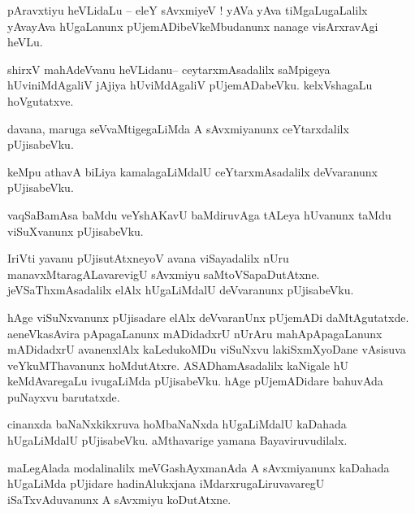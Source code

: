 \documentclass{article}
\begin{document}

\begin{mn}%
pAravxtiyu heVLidaLu -- eleY sAvxmiyeV ! yAVa yAva tiMgaLugaLalilx yAvayAva hUgaLanunx 
pUjemADibeVkeMbudanunx nanage visArxravAgi heVLu.
\end{mn}

\begin{mn}%
shirxV mahAdeVvanu heVLidanu-- ceytarxmAsadalilx saMpigeya hUviniMdAgaliV jAjiya hUviMdAgaliV 
pUjemADabeVku. kelxVshagaLu hoVgutatxve.
\end{mn}

\begin{mn}%
davana, maruga seVvaMtigegaLiMda A sAvxmiyanunx ceYtarxdalilx pUjisabeVku.
\end{mn}

\begin{mn}%
keMpu athavA biLiya kamalagaLiMdalU ceYtarxmAsadalilx deVvaranunx pUjisabeVku.
\end{mn}

\begin{mn}%
vaqSaBamAsa baMdu veYshAKavU baMdiruvAga tALeya hUvanunx taMdu viSuXvanunx pUjisabeVku.
\end{mn}

\begin{mn}%
IriVti yavanu pUjisutAtxneyoV avana viSayadalilx nUru manavxMtaragALavarevigU sAvxmiyu 
saMtoVSapaDutAtxne. jeVSaThxmAsadalilx elAlx hUgaLiMdalU deVvaranunx pUjisabeVku.
\end{mn}

\begin{mn}%
hAge viSuNxvanunx pUjisadare elAlx deVvaranUnx pUjemADi daMtAgutatxde. aeneVkasAvira pApagaLanunx 
mADidadxrU nUrAru mahApApagaLanunx mADidadxrU avanenxlAlx kaLedukoMDu viSuNxvu lakiSxmXyoDane 
vAsisuva veYkuMThavanunx hoMdutAtxre. ASADhamAsadalilx kaNigale hU keMdAvaregaLu ivugaLiMda 
pUjisabeVku. hAge pUjemADidare bahuvAda puNayxvu barutatxde.
\end{mn}

\begin{mn}%
cinanxda baNaNxkikxruva hoMbaNaNxda hUgaLiMdalU kaDahada hUgaLiMdalU pUjisabeVku. aMthavarige 
yamana Bayaviruvudilalx.
\end{mn}

\begin{mn}%
maLegAlada modalinalilx meVGashAyxmanAda A sAvxmiyanunx kaDahada hUgaLiMda pUjidare hadinAlukxjana 
iMdarxrugaLiruvavaregU iSaTxvAduvanunx A sAvxmiyu koDutAtxne.
\end{mn}
\end{document}
